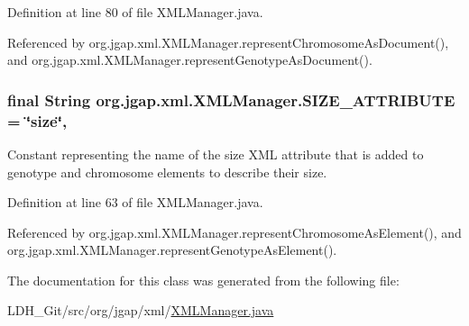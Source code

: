 Definition at line 80 of file X\-M\-L\-Manager.\-java.



Referenced by org.\-jgap.\-xml.\-X\-M\-L\-Manager.\-represent\-Chromosome\-As\-Document(), and org.\-jgap.\-xml.\-X\-M\-L\-Manager.\-represent\-Genotype\-As\-Document().

\hypertarget{classorg_1_1jgap_1_1xml_1_1_x_m_l_manager_a25640fa195b8f7899ff3d52f32f47a18}{
\subsubsection[{S\-I\-Z\-E\-\_\-\-A\-T\-T\-R\-I\-B\-U\-T\-E}]{\setlength{\rightskip}{0pt plus 5cm}final String org.\-jgap.\-xml.\-X\-M\-L\-Manager.\-S\-I\-Z\-E\-\_\-\-A\-T\-T\-R\-I\-B\-U\-T\-E = \char`\"{}size\char`\"{}\hspace{0.3cm}{\ttfamily [static]}, {\ttfamily [private]}}}\label{classorg_1_1jgap_1_1xml_1_1_x_m_l_manager_a25640fa195b8f7899ff3d52f32f47a18}
Constant representing the name of the size X\-M\-L attribute that is added to genotype and chromosome elements to describe their size. 

Definition at line 63 of file X\-M\-L\-Manager.\-java.



Referenced by org.\-jgap.\-xml.\-X\-M\-L\-Manager.\-represent\-Chromosome\-As\-Element(), and org.\-jgap.\-xml.\-X\-M\-L\-Manager.\-represent\-Genotype\-As\-Element().



The documentation for this class was generated from the following file\-:\begin{DoxyCompactItemize}
\item 
L\-D\-H\-\_\-\-Git/src/org/jgap/xml/\hyperlink{_x_m_l_manager_8java}{X\-M\-L\-Manager.\-java}\end{DoxyCompactItemize}
